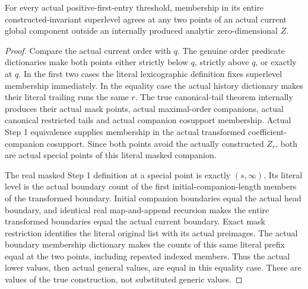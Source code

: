 \begin{lemma}
\label{hir:general-two-actual-generic-positive-value}
\leanok
For every actual positive-first-entry threshold, membership in its entire
constructed-invariant superlevel agrees at any two points of an actual
current global component outside an internally produced analytic
zero-dimensional $Z$.
\end{lemma}
\begin{proof}
Compare the actual current order with $q$. The genuine order predicate
dictionaries make both points either strictly below $q$, strictly above
$q$, or exactly at $q$. In the first two cases the literal lexicographic
definition fixes superlevel membership immediately. In the equality case
the actual history dictionary makes their literal trailing runs the same
$r$. The true canonical-tail theorem internally produces their actual
mask points, actual maximal-order companions, actual canonical restricted
tails and actual companion cosupport membership. Actual Step 1 equivalence
supplies membership in the actual transformed coefficient-companion
cosupport. Since both points avoid the actually constructed $Z_r$, both
are actual special points of this literal masked companion.

The real masked Step 1 definition at a special point is exactly
$(s,\infty)$. Its literal level is the actual boundary count of the first
initial-companion-length members of the transformed boundary. Initial
companion boundaries equal the actual head boundary, and identical real
map-and-append recursion makes the entire transformed boundaries equal
the actual current boundary. Exact mask restriction identifies the literal
original list with its actual preimages. The actual boundary membership
dictionary makes the counts of this same literal prefix equal at the two
points, including repeated indexed members. Thus the actual lower values,
then actual general values, are equal in this equality case. These are
values of the true construction, not substituted generic values.
\end{proof}

